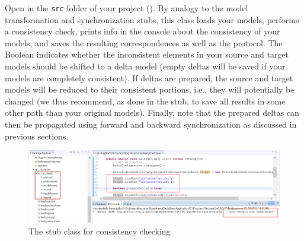 Open  in the \texttt{src} folder of your project ().
By analogy to the model transformation and synchronization stubs, this class loads your models, performs a consistency check, prints info in the console about the consistency of your models, and saves the resulting correspondences as well as the protocol.
The Boolean  indicates whether the inconsistent elements in your source and target models should be shifted to a delta model (empty deltas will be saved if your models are completely consistent).
If deltas are prepared, the source and target models will be reduced to their consistent portions, i.e., they will potentially be changed (we thus recommend, as done in the stub, to save all results in some other path than your original models).
Finally, note that the prepared deltas can then be propagated using forward and backward synchronization as discussed in previous sections.

\begin{figure}[htbp]
\renewcommand\figurename{Figure}
\begin{center}
\includegraphics[width=1\textwidth]{../../org.moflon.doc.handbook.04_tripleGraphTransformations/8_consistencyChecking/images/ccstub.png}
\caption{The stub class for consistency checking}
\label{eclipse:ccstub}
\end{center}
\end{figure}

